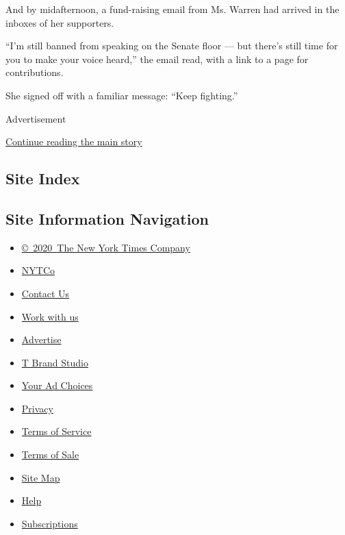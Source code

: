And by midafternoon, a fund-raising email from Ms. Warren had arrived in
the inboxes of her supporters.

``I'm still banned from speaking on the Senate floor --- but there's
still time for you to make your voice heard,'' the email read, with a
link to a page for contributions.

She signed off with a familiar message: ``Keep fighting.''

Advertisement

\protect\hyperlink{after-bottom}{Continue reading the main story}

\hypertarget{site-index}{%
\subsection{Site Index}\label{site-index}}

\hypertarget{site-information-navigation}{%
\subsection{Site Information
Navigation}\label{site-information-navigation}}

\begin{itemize}
\tightlist
\item
  \href{https://help.nytimes.com/hc/en-us/articles/115014792127-Copyright-notice}{©~2020~The
  New York Times Company}
\end{itemize}

\begin{itemize}
\tightlist
\item
  \href{https://www.nytco.com/}{NYTCo}
\item
  \href{https://help.nytimes.com/hc/en-us/articles/115015385887-Contact-Us}{Contact
  Us}
\item
  \href{https://www.nytco.com/careers/}{Work with us}
\item
  \href{https://nytmediakit.com/}{Advertise}
\item
  \href{http://www.tbrandstudio.com/}{T Brand Studio}
\item
  \href{https://www.nytimes.com/privacy/cookie-policy\#how-do-i-manage-trackers}{Your
  Ad Choices}
\item
  \href{https://www.nytimes.com/privacy}{Privacy}
\item
  \href{https://help.nytimes.com/hc/en-us/articles/115014893428-Terms-of-service}{Terms
  of Service}
\item
  \href{https://help.nytimes.com/hc/en-us/articles/115014893968-Terms-of-sale}{Terms
  of Sale}
\item
  \href{https://spiderbites.nytimes.com}{Site Map}
\item
  \href{https://help.nytimes.com/hc/en-us}{Help}
\item
  \href{https://www.nytimes.com/subscription?campaignId=37WXW}{Subscriptions}
\end{itemize}
